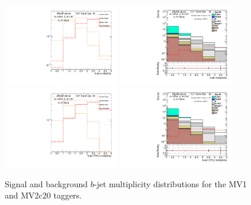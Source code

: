 \begin{figure}[htb!!]
\begin{center}
\includegraphics[width=0.45\textwidth]{FIGURES/BTAGGING/02_CutLEP_ll_NBJET_signals.pdf}
\includegraphics[width=0.45\textwidth]{FIGURES/BTAGGING/05_CutSS_ll_NBJET.pdf}\\
\includegraphics[width=0.45\textwidth]{FIGURES/BTAGGING/02_CutLEP_ll_NB1JET_signals.pdf} 
\includegraphics[width=0.45\textwidth]{FIGURES/BTAGGING/05_CutSS_ll_NB1JET.pdf}
\end{center}
\vspace{-0.2cm}
\caption{Signal and background $b$-jet multiplicity distributions for the MV1 and MV2c20 taggers.}
\label{fig:btagging_mv2_mv1}
\end{figure}

